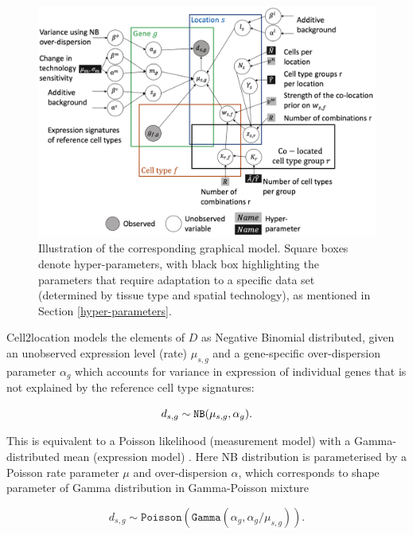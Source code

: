 \documentclass[11pt,a4paper]{article}
\begin{document}
\begin{figure}
    \includegraphics[scale=0.4]{images/LocationModelLinearDependentW.png}
    \caption{Illustration of the corresponding graphical model. Square boxes denote hyper-parameters, with black box highlighting the parameters that require adaptation to a specific data set (determined by tissue type and spatial technology), as mentioned in Section \ref{hyper-parameters}.}
    \label{fig:graphical_model}
\end{figure}

Cell2location models the elements of $D$ as Negative Binomial distributed, given an unobserved expression level (rate) $\mu_{s,g}$ and a gene-specific over-dispersion parameter $\alpha_g$ which accounts for variance in expression of individual genes that is not explained by the reference cell type signatures: 

\begin{linenomath*} \begin{equation} \label{eq:c2l:1}
d_{s,g} \sim \mathtt{NB}(\mu_{s,g}, \alpha_g). \\
\end{equation} \end{linenomath*}

This is equivalent to a Poisson likelihood (measurement model) with a Gamma-distributed mean (expression model)
\autocite{sarkar_separating_2020}. Here NB distribution is parameterised by a Poisson rate parameter $\mu$ and over-dispersion $\alpha$, which corresponds to shape parameter of Gamma distribution in Gamma-Poisson mixture

\begin{linenomath*} \begin{equation} \label{eq:c2l:1}
d_{s,g} \sim \mathtt{Poisson}(\mathtt{Gamma}(\alpha_g, \alpha_g / \mu_{s,g})).
\end{equation} \end{linenomath*}
\end{document}
